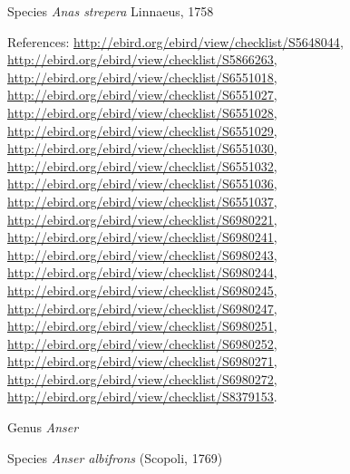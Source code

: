 \documentclass[9pt, article]{memoir}
\begin{document}
\begin{multicols}{2}
\vspace{6pt}\noindent\hspace{36pt}Species \textit{Anas strepera} Linnaeus, 1758


\vspace{6pt}References: 
\url{http://ebird.org/ebird/view/checklist/S5648044}, 
\url{http://ebird.org/ebird/view/checklist/S5866263}, 
\url{http://ebird.org/ebird/view/checklist/S6551018}, 
\url{http://ebird.org/ebird/view/checklist/S6551027}, 
\url{http://ebird.org/ebird/view/checklist/S6551028}, 
\url{http://ebird.org/ebird/view/checklist/S6551029}, 
\url{http://ebird.org/ebird/view/checklist/S6551030}, 
\url{http://ebird.org/ebird/view/checklist/S6551032}, 
\url{http://ebird.org/ebird/view/checklist/S6551036}, 
\url{http://ebird.org/ebird/view/checklist/S6551037}, 
\url{http://ebird.org/ebird/view/checklist/S6980221}, 
\url{http://ebird.org/ebird/view/checklist/S6980241}, 
\url{http://ebird.org/ebird/view/checklist/S6980243}, 
\url{http://ebird.org/ebird/view/checklist/S6980244}, 
\url{http://ebird.org/ebird/view/checklist/S6980245}, 
\url{http://ebird.org/ebird/view/checklist/S6980247}, 
\url{http://ebird.org/ebird/view/checklist/S6980251}, 
\url{http://ebird.org/ebird/view/checklist/S6980252}, 
\url{http://ebird.org/ebird/view/checklist/S6980271}, 
\url{http://ebird.org/ebird/view/checklist/S6980272}, 
\url{http://ebird.org/ebird/view/checklist/S8379153}.

\vspace{6pt}\noindent\hspace{30pt}Genus \textit{Anser}


\vspace{6pt}\noindent\hspace{36pt}Species \textit{Anser albifrons} (Scopoli, 1769)



\end{multicols}
\end{document}
